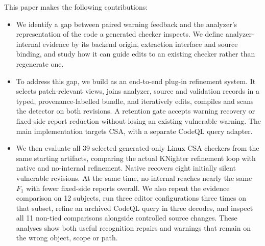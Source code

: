 This paper makes the following contributions:
\begin{itemize}[leftmargin=*]
  \item We identify a gap between paired warning feedback and the analyzer's representation of the code a generated checker inspects. We define analyzer-internal evidence by its backend origin, extraction interface and source binding, and study how it can guide edits to an existing checker rather than regenerate one.
  \item To address this gap, we build \toolname as an end-to-end plug-in refinement system. It selects patch-relevant views, joins analyzer, source and validation records in a typed, provenance-labelled bundle, and iteratively edits, compiles and scans the detector on both revisions. A retention gate accepts warning recovery or fixed-side report reduction without losing an existing vulnerable warning. The main implementation targets CSA, with a separate CodeQL query adapter.
  \item We then evaluate all 39 selected generated-only Linux CSA checkers from the same starting artifacts, comparing the actual KNighter refinement loop with native and no-internal refinement. Native recovers eight initially silent vulnerable revisions. At the same time, no-internal reaches nearly the same $F_1$ with fewer fixed-side reports overall. We also repeat the evidence comparison on 12 subjects, run three editor configurations three times on that subset, refine an archived CodeQL query in three decodes, and inspect all 11 non-tied comparisons alongside controlled source changes. These analyses show both useful recognition repairs and warnings that remain on the wrong object, scope or path.
\end{itemize}
